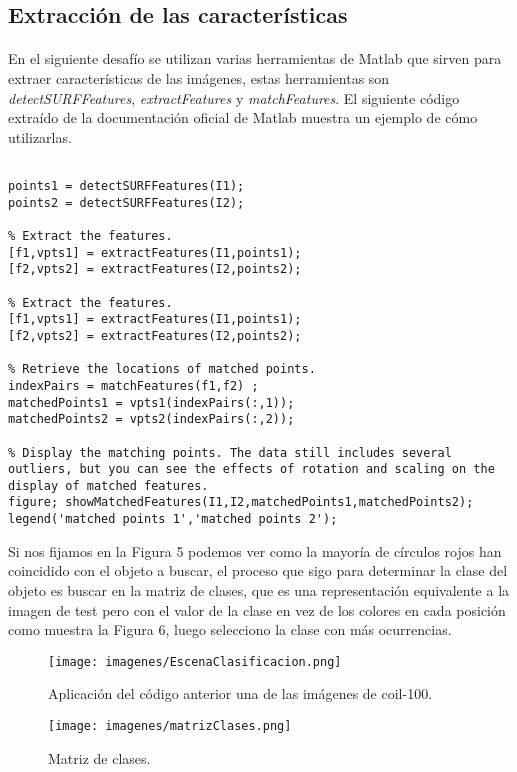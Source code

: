 \documentclass[es,gi]{ifirak}\usepackage[]{graphicx}\usepackage[]{color}
\begin{document}
\subsection{Extracción de las características}
\paragraph{} En el siguiente desafío se utilizan varias herramientas de Matlab que sirven para extraer características de las imágenes, estas herramientas son \textit{detectSURFFeatures}, \textit{extractFeatures} y \textit{matchFeatures}. El siguiente código extraído de la documentación oficial de Matlab muestra un ejemplo de cómo utilizarlas.

\begin{lstlisting}

points1 = detectSURFFeatures(I1);
points2 = detectSURFFeatures(I2);

% Extract the features.
[f1,vpts1] = extractFeatures(I1,points1);
[f2,vpts2] = extractFeatures(I2,points2);

% Extract the features.
[f1,vpts1] = extractFeatures(I1,points1);
[f2,vpts2] = extractFeatures(I2,points2);

% Retrieve the locations of matched points.
indexPairs = matchFeatures(f1,f2) ;
matchedPoints1 = vpts1(indexPairs(:,1));
matchedPoints2 = vpts2(indexPairs(:,2));

% Display the matching points. The data still includes several outliers, but you can see the effects of rotation and scaling on the display of matched features.
figure; showMatchedFeatures(I1,I2,matchedPoints1,matchedPoints2);
legend('matched points 1','matched points 2');
\end{lstlisting}

\vspace*{1cm}
Si nos fijamos en la Figura 5 podemos ver como la mayoría de círculos rojos han coincidido con el objeto a buscar, el proceso que sigo para determinar la clase del objeto es buscar en la matriz de clases, que es una representación equivalente a la imagen de test pero con el valor de la clase en vez de los colores en cada posición como muestra la Figura 6, luego selecciono la clase con más ocurrencias.

\begin{figure}[hbtp]
\centering
\texttt{[image: imagenes/EscenaClasificacion.png]}
\caption{Aplicación del código anterior una de las imágenes de coil-100.}

\texttt{[image: imagenes/matrizClases.png]}
\caption{Matriz de clases.}
\end{figure}
\end{document}
